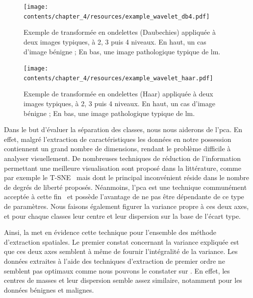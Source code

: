 \begin{figure}[H]
    \centering
    \texttt{[image: contents/chapter\_4/resources/example\_wavelet\_db4.pdf]}
    \caption{Exemple de transformée en ondelettes (Daubechies) appliquée à deux images typiques, à 2, 3 puis 4 niveaux. En haut, un cas d'image bénigne ; En bas, une image pathologique typique de \gls{lm}.}
    \label{fig:example_wavelet_db4}
\end{figure}\par

\begin{figure}[H]
    \centering
    \texttt{[image: contents/chapter\_4/resources/example\_wavelet\_haar.pdf]}
    \caption{Exemple de transformée en ondelettes (Haar) appliquée à deux images typiques, à 2, 3 puis 4 niveaux. En haut, un cas d'image bénigne ; En bas, une image pathologique typique de \gls{lm}.}
    \label{fig:example_wavelet_haar}
\end{figure}\par

Dans le but d'évaluer la séparation des classes, nous nous aiderons de l'\gls{pca}. En effet, malgré l'extraction de caractéristiques les données en notre possession contiennent un grand nombre de dimensions, rendant le problème difficile à analyser visuellement. De nombreuses techniques de réduction de l'information permettant une meilleure visualisation sont proposé dans la littérature, comme par exemple le T-SNE~\cite{Maaten2008} mais dont le principal inconvénient réside dans le nombre de degrés de liberté proposés. Néanmoins, l'\gls{pca} est une technique communément acceptée à cette fin~\cite{Himberg2001} et possède l'avantage de ne pas être dépendante de ce type de paramètres. Nous faisons également figurer la variance propre à ces deux axes, et pour chaque classes leur centre et leur dispersion sur la base de l'écart type.\par

Ainsi, la  met en évidence cette technique pour l'ensemble des méthode d'extraction spatiales. Le premier constat concernant la variance expliquée est que ces deux axes semblent à même de fournir l'intégralité de la variance. Les données extraites à l'aide des techniques d'extraction de premier ordre ne semblent pas optimaux comme nous pouvons le constater sur . En effet, les centres de masses et leur dispersion semble assez similaire, notamment pour les données bénignes et malignes.\par

